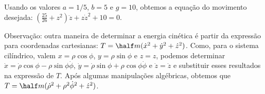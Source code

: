 \begin{question}
\begin{solution}
		Usando os valores $a = 1/5$, $b = 5$ e $g = 10$, obtemos a equação do movimento desejada: %
		$(\frac{25}{26} + z^2)\ddot z + z\dot z^2 + 10 = 0$. %

		Observação: outra maneira de determinar a energia cinética é partir da expressão para coordenadas cartesianas: $T = \half m (\dot x^2 + \dot y^2 + \dot z^2)$.
		Como, para o sistema cilíndrico, valem $x = \rho\cos\phi$, $y = \rho\sin\phi$ e $z = z$, podemos determinar $\dot x = \dot\rho \cos\phi - \rho\sin\phi \dot \phi$, $\dot y = \dot\rho \sin\phi + \rho\cos\phi \dot \phi$ e $\dot z = \dot z$ e substituir esses resultados na expressão de $T$. Após algumas manipulações algébricas, obtemos que $T = \half m (\dot\rho^2 + \rho^2\dot\phi^2 + \dot z^2)$. 
	\end{solution}
\end{question}